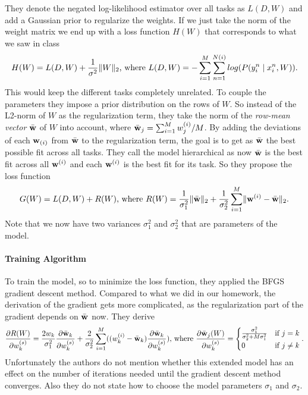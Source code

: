They denote the negated log-likelihood estimator over all tasks as $L(D,W)$ and add a Gaussian prior to regularize the weights. If we just take the norm of the weight matrix we end up with a loss function $H(W)$ that corresponds to what we saw in class
\begin{align*}
H(W) = L(D,W) + \frac{1}{\sigma^2} \lVert W\rVert_2 \text{, where } L(D,W) = -\sum_{i=1}^{M} \sum_{n=1}^{N(i)} log(P(y_i^n \mid x_i^n, W)).
\end{align*}
This would keep the different tasks completely unrelated. To couple the parameters they impose a prior distribution on the rows of $W$. So instead of the L2-norm of $W$ as the regularization term, they take the norm of the \emph{row-mean vector} $\bar{\textbf{w}}$ of $W$ into account, where $\bar{\textbf{w}}_j = \sum_{i=1}^M w_{j}^{(i)}/M$.
By adding the deviations of each $\textbf{w}_{(i)}$ from $\bar{\textbf{w}}$ to the regularization term, the goal is to get as $\bar{\textbf{w}}$ the best possible fit across all tasks. They call the model hierarchical as now $\bar{\textbf{w}}$ is the best fit across all $\textbf{w}^{(i)}$ and each $\textbf{w}^{(i)}$ is the best fit for its task. So they propose the loss function
\begin{align*}
G(W) = L(D,W) + R(W) \text{, where } R(W) = \frac{1}{\sigma_1^2} \lVert\bar{\textbf{w}}\rVert_2 + \frac{1}{\sigma_2^2} \sum_{i=1}^M \lVert\textbf{w}^{(i)} - \bar{\textbf{w}}\rVert_2.
\end{align*}
Note that we now have two variances $\sigma_1^2$ and $\sigma_2^2$ that are parameters of the model.

\paragraph{Training Algorithm}
To train the model, so to minimize the loss function, they applied the BFGS gradient descent method. Compared to what we did in our homework, the derivation of the gradient gets more complicated, as the regularization part of the gradient depends on $\bar{\textbf{w}}$ now. They derive
\begin{align*}
\frac{\partial R(W)}{\partial w_k^{(s)}} = \frac{2 w_k}{\sigma_1^2}\frac{\partial \bar{\textbf{w}}_k}{\partial w_k^{(s)}} + \frac{2}{\sigma_2^2} \sum_{i=1}^{M}((w_k^{(i)} - \bar{\textbf{w}}_k)\frac{\partial\bar{\textbf{w}}_k}{\partial w_k^{(s)}}) \text{, where } \frac{\partial \bar{\textbf{w}}_j(W)}{\partial w_k^{(s)}} = \begin{cases} \frac{\sigma_1^2}{\sigma_2^2 + M\sigma_1^2} & \text{if } j=k\\
0 & \text{if } j\neq k
\end{cases}.
\end{align*}
Unfortunately the authors do not mention whether this extended model has an effect on the number of iterations needed until the gradient descent method converges. Also they do not state how to choose the model parameters $\sigma_1$ and $\sigma_2$.

